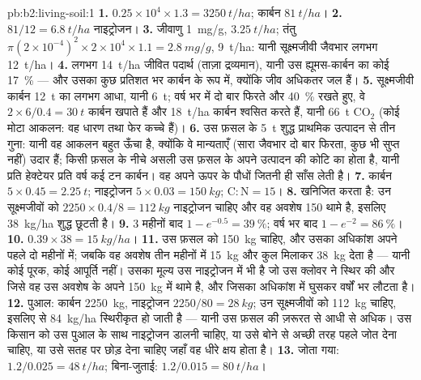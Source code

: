 \begin{solution}{pb:b2:living-soil:1}
\textbf{1.} $0.25\times 10^{4}\times 1.3 = \qty{3250}{t/ha}$;
कार्बन $\qty{81}{t/ha}$।
\textbf{2.} $81/12 = \qty{6.8}{t/ha}$ नाइट्रोजन।
\textbf{3.} जीवाणु \qty{1}{mg/g}, $\qty{3.25}{t/ha}$; तंतु
$\pi(2\times 10^{-4})^{2}\times 2\times 10^{4}\times 1.1 =
\qty{2.8}{mg/g}$, \qty{9}{t/ha}: यानी सूक्ष्मजीवी जैवभार लगभग
\qty{12}{t/ha}।
\textbf{4.} लगभग \qty{14}{t/ha} जीवित पदार्थ (ताज़ा द्रव्यमान),
यानी उस ह्यूमस-कार्बन का कोई \qty{17}{\%} --- और उसका कुछ प्रतिशत भर
कार्बन के रूप में, क्योंकि जीव अधिकतर जल हैं।
\textbf{5.} सूक्ष्मजीवी कार्बन \qty{12}{t} का लगभग आधा, यानी \qty{6}{t};
वर्ष भर में दो बार फिरते और \qty{40}{\%} रखते हुए, वे
$2\times 6/0.4 = \qty{30}{t}$ कार्बन खपाते हैं और \qty{18}{t/ha}
कार्बन श्वसित करते हैं, यानी \qty{66}{t} $\mathrm{CO_2}$ (कोई मोटा आकलन: वह
धारण तथा फेर कच्चे हैं)।
\textbf{6.} उस फ़सल के \qty{5}{t} शुद्ध प्राथमिक उत्पादन से
तीन गुना: यानी वह आकलन बहुत ऊँचा है, क्योंकि वे मान्यताएँ (सारा
जैवभार दो बार फिरता, कुछ भी सुप्त नहीं) उदार हैं;
किसी फ़सल के नीचे असली  उस फ़सल के अपने
उत्पादन की कोटि का होता है, यानी प्रति हेक्टेयर प्रति वर्ष कई टन कार्बन। वह
 अपने ऊपर के पौधों जितनी ही साँस लेती है।
\textbf{7.} कार्बन $5\times 0.45 = \qty{2.25}{t}$; नाइट्रोजन $5\times
0.03 = \qty{150}{kg}$; $\mathrm{C:N} = 15$।
\textbf{8.} खनिजित करता है: उन सूक्ष्मजीवों को $2250\times 0.4/8 =
\qty{112}{kg}$ नाइट्रोजन चाहिए और वह अवशेष 150 थामे है, इसलिए
\qty{38}{kg/ha} शुद्ध छूटती है।
\textbf{9.} 3 महीनों बाद $1 - e^{-0.5} = \qty{39}{\%}$; वर्ष भर बाद $1 - e^{-2}
= \qty{86}{\%}$।
\textbf{10.} $0.39\times 38 = \qty{15}{kg/ha}$।
\textbf{11.} उस फ़सल को \qty{150}{kg} चाहिए, और उसका अधिकांश अपने पहले
दो महीनों में; जबकि वह अवशेष तीन महीनों में \qty{15}{kg} और
कुल मिलाकर \qty{38}{kg} देता है --- यानी कोई पूरक, कोई आपूर्ति नहीं। उसका मूल्य
उस नाइट्रोजन में भी है जो उस क्लोवर ने स्थिर की और जिसे वह उस अवशेष के
अपने \qty{150}{kg} में थामे है, और जिसका अधिकांश  में घुसकर
वर्षों भर लौटता है।
\textbf{12.} पुआल: कार्बन \qty{2250}{kg}, नाइट्रोजन $2250/80 =
\qty{28}{kg}$; उन सूक्ष्मजीवों को \qty{112}{kg} चाहिए, इसलिए  से
\qty{84}{kg/ha} स्थिरीकृत हो जाती है --- यानी उस फ़सल की ज़रूरत से आधी से अधिक।
उस किसान को उस पुआल के साथ नाइट्रोजन डालनी चाहिए, या उसे बोने से
अच्छी तरह पहले जोत देना चाहिए, या उसे सतह पर छोड़ देना चाहिए जहाँ वह धीरे क्षय होता है।
\textbf{13.} जोता गया: $1.2/0.025 = \qty{48}{t/ha}$; बिना-जुताई:
$1.2/0.015 = \qty{80}{t/ha}$।

\end{solution}
